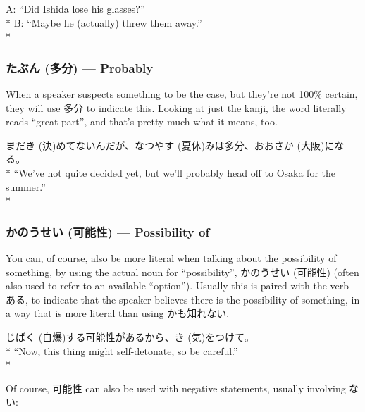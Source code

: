 \documentclass[11pt, b5paper, twoside, openright, onecolumn]{book}
\makeatletter
\newcommand*{\rubystack}[2]{{\relscale{0.5}%
  \begin{tabular}[b]{@{}c@{}}%
    {#1}\\%
   {\textscale{2}{#2}}%
  \end{tabular}}%
}
\DeclareRobustCommand*{\ruby}[2]{%
  \mbox{%
    \setlength{\parskip}{0ex}%
    \BeginAccSupp{method=pdfstringdef,ActualText={#1}}%
      \rubystack{\phantom{#2}}{#1}%
      \llap{%
        \rubystack{#2}{\phantom{#1}}%
      }%
    \EndAccSupp{}%
  }%
}
\renewcommand*{\ruby}[2]{#2 (#1)}%
\newenvironment{exampleblock}{
\setlength{\parindent}{0.6in}
\begin{minipage}[t]{\dimexpr\textwidth-\parindent}}
{\end{minipage}}
\makeatother
\begin{document}
\begin{exampleblock}
A: “Did Ishida lose his glasses?” \\* 
B: “Maybe he (actually) threw them away.” \\* 
\end{exampleblock}
\subsubsection{\ruby{多分}{たぶん} — Probably}


When a speaker suspects something to be the case‚ but they’re not 100\% certain‚ they will use 多分 to indicate this. Looking at just the kanji‚ the word literally reads “great part”‚ and that’s pretty much what it means‚ too.

\vspace{0.4cm}
\begin{exampleblock}
まだ\ruby{決}{き}めてないんだが、\ruby{夏休}{なつやす}みは多分、\ruby{大阪}{おおさか}になる。 \\* 
“We’ve not quite decided yet‚ but we’ll probably head off to Osaka for the summer.” \\* 
\end{exampleblock}
\subsubsection{\ruby{可能性}{かのうせい} — Possibility of}


You can‚ of course‚ also be more literal when talking about the possibility of something‚ by using the actual noun for “possibility”‚ \ruby{可能性}{かのうせい} (often also used to refer to an available “option”). Usually this is paired with the verb ある‚ to indicate that the speaker believes there is the possibility of something‚ in a way that is more literal than using かも知れない.

\vspace{0.4cm}
\begin{exampleblock}
\ruby{自爆}{じばく}する可能性があるから、\ruby{気}{き}をつけて。 \\* 
“Now‚ this thing might self-detonate‚ so be careful.” \\* 
\end{exampleblock}
\vspace{0.2cm}

Of course‚ 可能性 can also be used with negative statements‚ usually involving ない:
\end{document}
